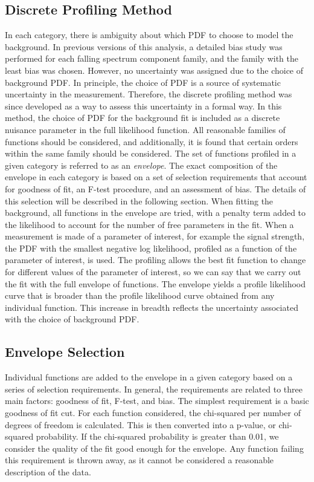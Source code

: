 \subsection{Discrete Profiling Method}\label{sec:envelope}
In each category, there is ambiguity about which PDF to choose to model the background. 
In previous versions of this analysis, a detailed bias study 
was performed for each falling spectrum component family, and the family with the least bias was chosen. However, 
no uncertainty was assigned due to the choice of background PDF. In principle, the 
choice of PDF is a source of systematic uncertainty in the measurement. 
Therefore, the discrete profiling method was since developed as a way to assess this uncertainty in a formal way. 
In this method, the choice of PDF for the background fit is included as a 
discrete nuisance parameter in the full likelihood function. All reasonable families of 
functions should be considered, and additionally, it is found that certain orders within 
the same family should be considered. The set of functions profiled in a given category is referred to as an \textit{envelope}.
The exact composition of the envelope in each category
is based on a set of selection requirements that account for goodness of fit, an F-test procedure, 
and an assessment of bias. The details of this selection will be described in the following section.
When fitting the background, all functions in the envelope are tried, with a penalty term added to the likelihood 
to account for the number of free parameters in the fit. When a measurement is made of 
a parameter of interest, for example the signal strength, the PDF with the smallest negative log likelihood, 
profiled as a function of the parameter of interest, is used. The profiling allows the best fit function to change for 
different values of the parameter of interest, so we can say that we carry out the fit with the full envelope of functions.  
The envelope yields a profile likelihood curve that is broader than the profile likelihood curve obtained from any individual function. 
This increase in breadth reflects the uncertainty associated with the choice of background PDF. 

\subsection{Envelope Selection}\label{sec:envelope_selection}
Individual functions are added to the envelope in a given category based on a series of selection requirements. In general, 
the requirements are related to three main factors: goodness of fit, F-test, and bias. The simplest requirement is a basic 
goodness of fit cut. For each function considered, the chi-squared per number of degrees of freedom is calculated. This is 
then converted into a p-value, or chi-squared probability. If the chi-squared probability is greater than 0.01, we consider 
the quality of the fit good enough for the envelope. Any function failing this requirement is thrown away, as it cannot
be considered a reasonable description of the data. 

